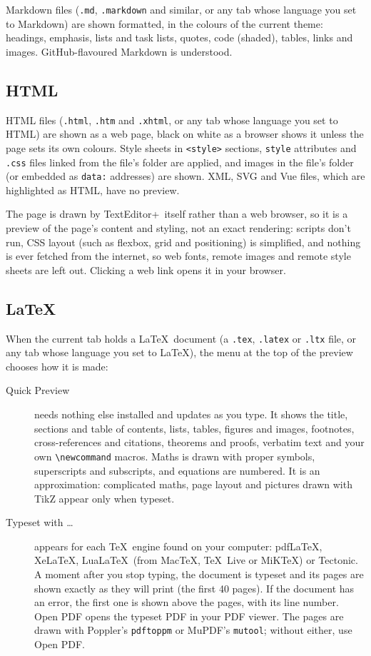 \documentclass[11pt,a4paper]{article}
\newcommand{\appname}{TextEditor+}
\newcommand{\ui}[1]{\textsf{#1}}
\begin{document}
Markdown files (\texttt{.md}, \texttt{.markdown} and similar, or any tab whose
language you set to Markdown) are shown formatted, in the colours of the
current theme: headings, emphasis, lists and task lists, quotes, code (shaded),
tables, links and images. GitHub-flavoured Markdown is understood.

\subsection{HTML}

HTML files (\texttt{.html}, \texttt{.htm} and \texttt{.xhtml}, or any tab whose
language you set to HTML) are shown as a web page, black on white as a
browser shows it unless the page sets its own colours. Style sheets in
\texttt{<style>} sections, \texttt{style} attributes and \texttt{.css} files
linked from the file's folder are applied, and images in the file's folder
(or embedded as \texttt{data:} addresses) are shown. XML, SVG and Vue files,
which are highlighted as HTML, have no preview.

The page is drawn by \appname\ itself rather than a web browser, so it is a
preview of the page's content and styling, not an exact rendering: scripts
don't run, CSS layout (such as flexbox, grid and positioning) is simplified,
and nothing is ever fetched from the internet, so web fonts, remote images
and remote style sheets are left out. Clicking a web link opens it in your
browser.

\subsection{\LaTeX}

When the current tab holds a \LaTeX\ document (a \texttt{.tex}, \texttt{.latex}
or \texttt{.ltx} file, or any tab whose language you set to \LaTeX), the menu
at the top of the preview chooses how it is made:

\begin{description}
  \item[Quick Preview] needs nothing else installed and updates as you type.
    It shows the title, sections and table of contents, lists, tables,
    figures and images, footnotes, cross-references and citations, theorems
    and proofs, verbatim text and your own \verb|\newcommand| macros. Maths is
    drawn with proper symbols, superscripts and subscripts, and equations are
    numbered. It is an approximation: complicated maths, page layout and
    pictures drawn with TikZ appear only when typeset.
  \item[Typeset with \ldots] appears for each \TeX\ engine found on your
    computer: pdf\LaTeX, Xe\LaTeX, Lua\LaTeX\ (from MacTeX, \TeX~Live or MiK\TeX)
    or Tectonic. A moment after you stop typing, the document is typeset and
    its pages are shown exactly as they will print (the first 40 pages). If
    the document has an error, the first one is shown above the pages, with
    its line number. \ui{Open PDF} opens the typeset PDF in your PDF viewer.
    The pages are drawn with Poppler's \texttt{pdftoppm} or MuPDF's
    \texttt{mutool}; without either, use \ui{Open PDF}.
\end{description}
\end{document}
